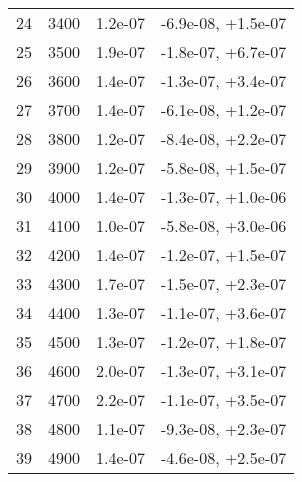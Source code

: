 \begin{table}
\begin{adjustbox}{width=1\textwidth/2}
\begin{tabular}{|c|c|c|c|}
\cline{1-4}
24 & 3400 & 1.2e-07 & -6.9e-08, +1.5e-07 \\
\cline{1-4}
25 & 3500 & 1.9e-07 & -1.8e-07, +6.7e-07 \\
\cline{1-4}
26 & 3600 & 1.4e-07 & -1.3e-07, +3.4e-07 \\
\cline{1-4}
27 & 3700 & 1.4e-07 & -6.1e-08, +1.2e-07 \\
\cline{1-4}
28 & 3800 & 1.2e-07 & -8.4e-08, +2.2e-07 \\
\cline{1-4}
29 & 3900 & 1.2e-07 & -5.8e-08, +1.5e-07 \\
\cline{1-4}
30 & 4000 & 1.4e-07 & -1.3e-07, +1.0e-06 \\
\cline{1-4}
31 & 4100 & 1.0e-07 & -5.8e-08, +3.0e-06 \\
\cline{1-4}
32 & 4200 & 1.4e-07 & -1.2e-07, +1.5e-07 \\
\cline{1-4}
33 & 4300 & 1.7e-07 & -1.5e-07, +2.3e-07 \\
\cline{1-4}
34 & 4400 & 1.3e-07 & -1.1e-07, +3.6e-07 \\
\cline{1-4}
35 & 4500 & 1.3e-07 & -1.2e-07, +1.8e-07 \\
\cline{1-4}
36 & 4600 & 2.0e-07 & -1.3e-07, +3.1e-07 \\
\cline{1-4}
37 & 4700 & 2.2e-07 & -1.1e-07, +3.5e-07 \\
\cline{1-4}
38 & 4800 & 1.1e-07 & -9.3e-08, +2.3e-07 \\
\cline{1-4}
39 & 4900 & 1.4e-07 & -4.6e-08, +2.5e-07 \\
\cline{1-4}
\end{tabular}
\end{adjustbox}
\end{table}

